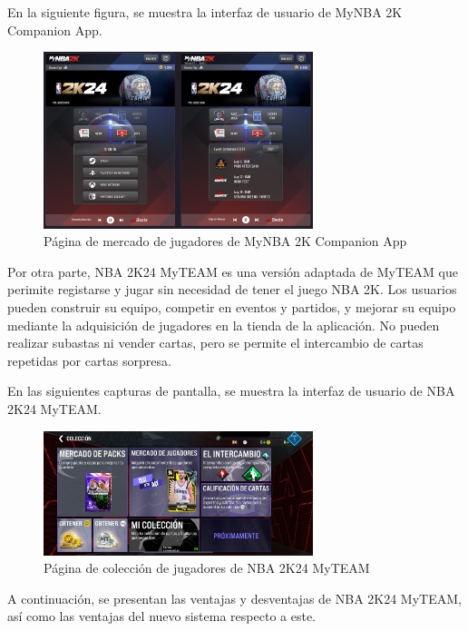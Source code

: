 En la siguiente figura, se muestra la interfaz de usuario de MyNBA 2K Companion App.
\begin{figure}[H]
    \centering
    \includegraphics[width=0.7\textwidth]{figures/4-Estudio-viabilidad/4_NBA.png}
    \caption{Página de mercado de jugadores de MyNBA 2K Companion App}
    \label{fig:nba_2k}
    \hypertarget{fig:nba_2k}{}
\end{figure}

Por otra parte, NBA 2K24 MyTEAM es una versión adaptada de MyTEAM que perimite registarse y jugar sin necesidad de tener el juego NBA 2K. 
Los usuarios pueden construir su equipo, competir en eventos y partidos, y mejorar su equipo mediante la adquisición de jugadores en la tienda de la aplicación. 
No pueden realizar subastas ni vender cartas, pero se permite el intercambio de cartas repetidas por cartas sorpresa.

En las siguientes capturas de pantalla, se muestra la interfaz de usuario de NBA 2K24 MyTEAM.
\begin{figure}[H]
    \centering
    \includegraphics[width=0.7\textwidth]{figures/4-Estudio-viabilidad/4_NBA2.jpeg}
    \caption{Página de colección de jugadores de NBA 2K24 MyTEAM}
    \label{fig:nba_2k_2}
    \hypertarget{fig:nba_2k_2}{}
\end{figure}

A continuación, se presentan las ventajas y desventajas de NBA 2K24 MyTEAM, así como las ventajas del nuevo sistema respecto a este.

